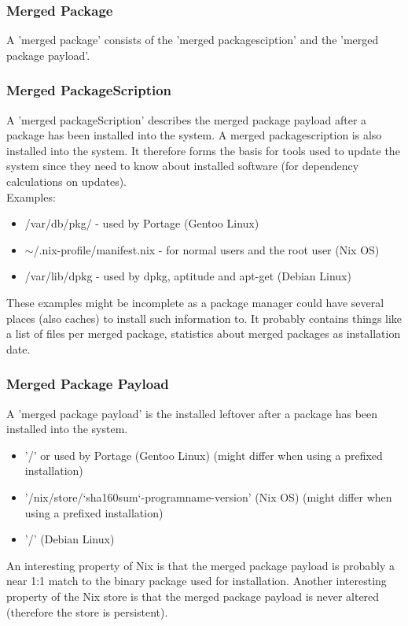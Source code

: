 \documentclass[a4paper,10pt]{article}
\begin{document}
\subsubsection*{Merged Package}
A 'merged package' consists of the 'merged packagesciption' and the 'merged package payload'.

\subsubsection*{Merged PackageScription}
A 'merged packageScription' describes the merged package payload after a package has been installed into the system. A merged packagescription is also installed into the system. It therefore forms the basis for tools used to update the system since they need to know about installed software (for dependency calculations on updates). \\

Examples:
\begin{itemize}
 \item /var/db/pkg/ - used by Portage (Gentoo Linux)
 \item $\sim$/.nix-profile/manifest.nix - for normal users and the root user (Nix OS)
 \item /var/lib/dpkg - used by dpkg, aptitude and apt-get (Debian Linux)
\end{itemize}
These examples might be incomplete as a package manager could have several places (also caches) to install such information to. It probably contains things like a list of files per merged package, statistics about merged packages as installation date.
 
\subsubsection*{Merged Package Payload}
A 'merged package payload' is the installed leftover after a package has been installed into the system.
\begin{itemize}
 \item '/' or used by Portage (Gentoo Linux) \hfill (might differ when using a prefixed installation)
 \item '/nix/store/`sha160sum`-programname-version' (Nix OS) \hfill (might differ when using a prefixed installation)
 \item '/' (Debian Linux)
\end{itemize}
An interesting property of Nix is that the merged package payload is probably a near 1:1 match to the binary package used for installation. Another interesting property of the Nix store is that the merged package payload is never altered (therefore the store is persistent).
\end{document}
